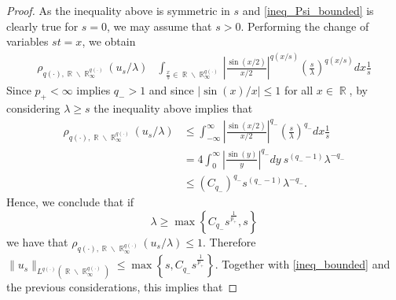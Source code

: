 \documentclass[11pt,reqno]{amsart}
\theoremstyle{definition}
\theoremstyle{definition}
\theoremstyle{definition}
\DeclareMathOperator{\R}{\mathbb{R}}
\begin{document}
\begin{proof}
    As the inequality above is symmetric in $s$ and \eqref{ineq_Psi_bounded} is clearly true for $s=0$, we may assume that $s>0$. Performing the change of variables $st=x$, we obtain
    \begin{align*}
       \rho_{q(\cdot),\R\backslash\R_{\infty}^{q(\cdot)}}(u_s/\lambda)&\int_{\frac{x}{s}\in\R\backslash\R_{\infty}^{q(\cdot)}}\left|\frac{\sin(x/2)}{x/2}\right|^{q(x/s)}\left(\frac{s}{\lambda}\right)^{q(x/s)}dx\frac{1}{s}%
    \end{align*}
  Since $p_{+}<\infty$ implies $q_{-}>1$ and since $|\sin(x)/x|\leq 1$ for all $x\in\R$, by considering $\lambda\geq s$ the inequality above implies that
     \begin{align*}
\rho_{q(\cdot),\R\backslash\R_{\infty}^{q(\cdot)}}(u_s/\lambda)&
       \leq \int_{-\infty}^{\infty}\left|\frac{\sin(x/2)}{x/2}\right|^{q_{-}}\left(\frac{s}{\lambda}\right)^{q_{-}}dx\frac{1}{s}%
       \\
       &=4\int_0^{\infty}\left|\frac{\sin(y)}{y}\right|^{q_{-}}dy\ s^{(q_{-}-1)}\lambda^{-q_{-}}%
       \\
       &\leq (C_{q_{-}})^{q_{-}}s^{(q_{-}-1)}\lambda^{-q_{-}}.
    \end{align*}
     Hence, we conclude that if 
   \begin{equation*}
\lambda\geq  \max\left\{C_{q_{-}}s^{\frac{1}{p_{+}}},s\right\}
   \end{equation*}
     we have that $\rho_{q(\cdot),\R\backslash\R_{\infty}^{q(\cdot)}}(u_s/\lambda)\leq 1$. Therefore $ \|u_s\|_{{L^{q(\cdot)}(\R\backslash\R_{\infty}^{q(\cdot)})}}\leq  \max\left\{s,C_{q_{-}}s^{\frac{1}{p_{+}}}\right\}$. Together with \eqref{ineq_bounded} and the previous considerations, this implies that

\end{proof}
\end{document}
